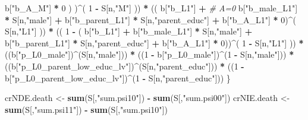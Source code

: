 \documentclass[
]{book}
\newenvironment{Shaded}{\begin{snugshade}}{\end{snugshade}}
\newcommand{\CommentTok}[1]{\textcolor[rgb]{0.56,0.35,0.01}{\textit{#1}}}
\newcommand{\DecValTok}[1]{\textcolor[rgb]{0.00,0.00,0.81}{#1}}
\newcommand{\FunctionTok}[1]{\textcolor[rgb]{0.13,0.29,0.53}{\textbf{#1}}}
\newcommand{\NormalTok}[1]{#1}
\newcommand{\OtherTok}[1]{\textcolor[rgb]{0.56,0.35,0.01}{#1}}
\newcommand{\SpecialCharTok}[1]{\textcolor[rgb]{0.81,0.36,0.00}{\textbf{#1}}}
\newcommand{\StringTok}[1]{\textcolor[rgb]{0.31,0.60,0.02}{#1}}
\begin{document}
\begin{Shaded}
\begin{Highlighting}[]
\NormalTok{                b[}\StringTok{"b\_A\_M"}\NormalTok{] }\SpecialCharTok{*} \DecValTok{0}\NormalTok{ ) )}\SpecialCharTok{\^{}}\NormalTok{( }\DecValTok{1} \SpecialCharTok{{-}}\NormalTok{ S[n,}\StringTok{"M"}\NormalTok{] )) }\SpecialCharTok{*}
\NormalTok{      (( b[}\StringTok{"b\_L1"}\NormalTok{] }\SpecialCharTok{+}                                                            \CommentTok{\# A=0}
\NormalTok{           b[}\StringTok{"b\_male\_L1"}\NormalTok{] }\SpecialCharTok{*}\NormalTok{ S[n,}\StringTok{"male"}\NormalTok{] }\SpecialCharTok{+}  
\NormalTok{           b[}\StringTok{"b\_parent\_L1"}\NormalTok{] }\SpecialCharTok{*}\NormalTok{ S[n,}\StringTok{"parent\_educ"}\NormalTok{] }\SpecialCharTok{+}
\NormalTok{           b[}\StringTok{"b\_A\_L1"}\NormalTok{] }\SpecialCharTok{*} \DecValTok{0}\NormalTok{)}\SpecialCharTok{\^{}}\NormalTok{( S[n,}\StringTok{"L1"}\NormalTok{] )) }\SpecialCharTok{*}
\NormalTok{      (( }\DecValTok{1} \SpecialCharTok{{-}}\NormalTok{ ( b[}\StringTok{"b\_L1"}\NormalTok{] }\SpecialCharTok{+}
\NormalTok{                 b[}\StringTok{"b\_male\_L1"}\NormalTok{] }\SpecialCharTok{*}\NormalTok{ S[n,}\StringTok{"male"}\NormalTok{] }\SpecialCharTok{+}  
\NormalTok{                 b[}\StringTok{"b\_parent\_L1"}\NormalTok{] }\SpecialCharTok{*}\NormalTok{ S[n,}\StringTok{"parent\_educ"}\NormalTok{] }\SpecialCharTok{+}
\NormalTok{                 b[}\StringTok{"b\_A\_L1"}\NormalTok{] }\SpecialCharTok{*} \DecValTok{0}\NormalTok{))}\SpecialCharTok{\^{}}\NormalTok{( }\DecValTok{1} \SpecialCharTok{{-}}\NormalTok{ S[n,}\StringTok{"L1"}\NormalTok{] )) }\SpecialCharTok{*}
\NormalTok{      ((b[}\StringTok{"p\_L0\_male"}\NormalTok{])}\SpecialCharTok{\^{}}\NormalTok{(S[n,}\StringTok{"male"}\NormalTok{])) }\SpecialCharTok{*} 
\NormalTok{      ((}\DecValTok{1} \SpecialCharTok{{-}}\NormalTok{ b[}\StringTok{"p\_L0\_male"}\NormalTok{])}\SpecialCharTok{\^{}}\NormalTok{(}\DecValTok{1} \SpecialCharTok{{-}}\NormalTok{ S[n,}\StringTok{"male"}\NormalTok{])) }\SpecialCharTok{*} 
\NormalTok{      ((b[}\StringTok{"p\_L0\_parent\_low\_educ\_lv"}\NormalTok{])}\SpecialCharTok{\^{}}\NormalTok{(S[n,}\StringTok{"parent\_educ"}\NormalTok{])) }\SpecialCharTok{*}
\NormalTok{      ((}\DecValTok{1} \SpecialCharTok{{-}}\NormalTok{ b[}\StringTok{"p\_L0\_parent\_low\_educ\_lv"}\NormalTok{])}\SpecialCharTok{\^{}}\NormalTok{(}\DecValTok{1} \SpecialCharTok{{-}}\NormalTok{ S[n,}\StringTok{"parent\_educ"}\NormalTok{]))}
\NormalTok{    \}}
  
\NormalTok{  crNDE.death }\OtherTok{\textless{}{-}} \FunctionTok{sum}\NormalTok{(S[,}\StringTok{"sum.psi10"}\NormalTok{]) }\SpecialCharTok{{-}} \FunctionTok{sum}\NormalTok{(S[,}\StringTok{"sum.psi00"}\NormalTok{])}
\NormalTok{  crNIE.death }\OtherTok{\textless{}{-}} \FunctionTok{sum}\NormalTok{(S[,}\StringTok{"sum.psi11"}\NormalTok{]) }\SpecialCharTok{{-}} \FunctionTok{sum}\NormalTok{(S[,}\StringTok{"sum.psi10"}\NormalTok{])}
  

\end{Highlighting}
\end{Shaded}
\end{document}
